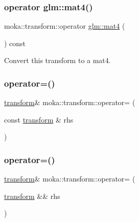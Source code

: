 \subsubsection{\texorpdfstring{operator glm::mat4()}{operator glm::mat4()}}
{\footnotesize\ttfamily moka\+::transform\+::operator \mbox{\hyperlink{namespacemoka_aed2224bc0e5b79e57a8975ded94ee1aaabe14b41eb96410ea28b32bc138d885ae}{glm\+::mat4}} (\begin{DoxyParamCaption}{ }\end{DoxyParamCaption}) const\hspace{0.3cm}{\ttfamily [explicit]}}



Convert this transform to a mat4. 

\mbox{\label{classmoka_1_1transform_ad7ea9908ebf679c89a5c329208791fcf}} 
\subsubsection{\texorpdfstring{operator=()}{operator=()}\hspace{0.1cm}{\footnotesize\ttfamily [1/2]}}
{\footnotesize\ttfamily \mbox{\hyperlink{classmoka_1_1transform}{transform}}\& moka\+::transform\+::operator= (\begin{DoxyParamCaption}\item[{const \mbox{\hyperlink{classmoka_1_1transform}{transform}} \&}]{rhs }\end{DoxyParamCaption})}

\mbox{\label{classmoka_1_1transform_a78e08f231ced4f99808ba2a66eace1a0}} 
\subsubsection{\texorpdfstring{operator=()}{operator=()}\hspace{0.1cm}{\footnotesize\ttfamily [2/2]}}
{\footnotesize\ttfamily \mbox{\hyperlink{classmoka_1_1transform}{transform}}\& moka\+::transform\+::operator= (\begin{DoxyParamCaption}\item[{\mbox{\hyperlink{classmoka_1_1transform}{transform}} \&\&}]{rhs }\end{DoxyParamCaption})\hspace{0.3cm}{\ttfamily [noexcept]}}

